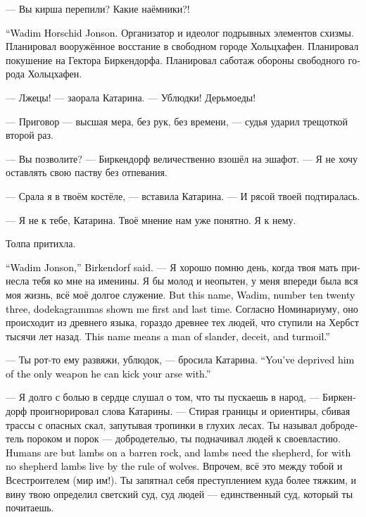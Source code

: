 \documentclass[a4paper,12pt,fleqn]{book}\usepackage{cooltooltips}\usepackage{polyglossia}\setdefaultlanguage[babelshorthands=true]{russian}\setotherlanguage{english}\defaultfontfeatures{Ligatures=TeX,Mapping=tex-text} \usepackage{xcolor}\definecolor{lightgray}{HTML}{bbbbbb}\color{lightgray}\newcommand{\ml}[3]{\textenglish{\textcolor{black}{#3}}}
\begin{document}
--- Вы кирша перепили?
Какие наёмники?!

\ml{$0$}
{--- Вадим Хоршид Йонзон.}
{``Wadim Horschid Jonson.}
Организатор и идеолог подрывных элементов схизмы.
Планировал вооружённое восстание в свободном городе Хольцхафен.
Планировал покушение на Гектора Биркендорфа.
Планировал саботаж обороны свободного города Хольцхафен.

--- Лжецы! --- заорала Катарина.
--- Ублюдки!
Дерьмоеды!

--- Приговор --- высшая мера, без рук, без времени, --- судья ударил трещоткой второй раз.

--- Вы позволите? --- Биркендорф величественно взошёл на эшафот.
--- Я не хочу оставлять свою паству без отпевания.

--- Срала я в твоём костёле, --- вставила Катарина.
--- И рясой твоей подтиралась.

--- Я не к тебе, Катарина.
Твоё мнение нам уже понятно.
Я к нему.

Толпа притихла.

\ml{$0$}
{--- Вадим Йонзон, --- сказал Биркендорф.}
{``Wadim Jonson,'' Birkendorf said.}
--- Я хорошо помню день, когда твоя мать принесла тебя ко мне на именины.
Я бы молод и неопытен, у меня впереди была вся моя жизнь, всё моё долгое служение.
\ml{$0$}
{Но это имя --- Вадим, номер тысяча двадцать три --- додекаграммы показали мне первый и последний раз.}
{But this name, Wadim, number ten twenty three, dodekagrammas shown me first and last time.}
Согласно Номинариуму, оно происходит из древнего языка, гораздо древнее тех людей, что ступили на Хербст тысячи лет назад.
\ml{$0$}
{Это имя означает --- клеветник, обманщик и смутьян.}
{This name means a man of slander, deceit, and turmoil.''}

--- Ты рот-то ему развяжи, ублюдок, --- бросила Катарина.
\ml{$0$}
{--- Ты его лишил единственного оружия, которым он может надрать тебе зад.}
{``You've deprived him of the only weapon he can kick your arse with.''}

--- Я долго с болью в сердце слушал о том, что ты пускаешь в народ, --- Биркендорф проигнорировал слова Катарины.
--- Стирая границы и ориентиры, сбивая трассы с опасных скал, запутывая тропинки в глухих лесах.
Ты называл добродетель пороком и порок --- добродетелью, ты подначивал людей к своевластию.
\ml{$0$}
{Люди суть агнцы на бесплодной скале, и агнцам нужен пастырь, ибо без пастыря агнцы живут по законам волков.}
{Humans are but lambs on a barren rock, and lambs need the shepherd, for with no shepherd lambs live by the rule of wolves.}
Впрочем, всё это между тобой и Всестроителем (мир им!).
Ты запятнал себя преступлением куда более тяжким, и вину твою определил светский суд, суд людей --- единственный суд, который ты почитаешь.
\end{document}

